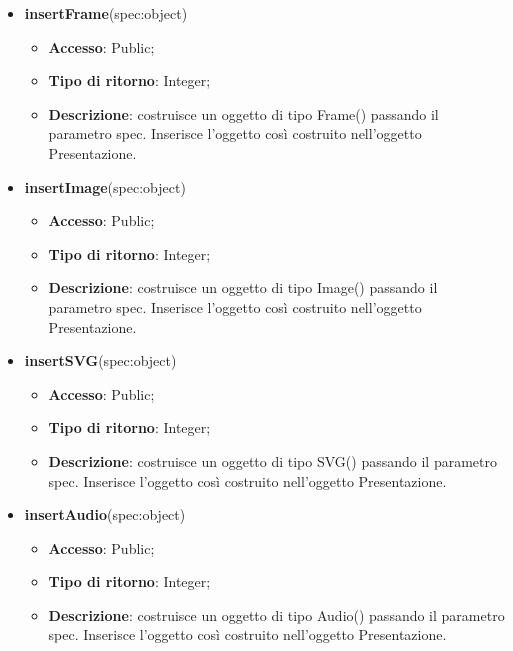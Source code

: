 {\begin{itemize}
\begin{itemize}
				\item \textbf{Accesso}: Public;
				\item \textbf{Tipo di ritorno}: Void;
				\item \textbf{Descrizione}: costruisce un oggetto di tipo Text() passando il parametro spec. Inserisce l’oggetto così costruito nell’oggetto Presentazione.
			\end{itemize}
			\item \textbf{insertFrame}(spec:object)
			\begin{itemize}
				\item \textbf{Accesso}: Public;
				\item \textbf{Tipo di ritorno}: Integer;
				\item \textbf{Descrizione}: costruisce un oggetto di tipo Frame() passando il parametro spec. Inserisce l’oggetto così costruito nell’oggetto Presentazione.
			\end{itemize}
			\item \textbf{insertImage}(spec:object)
			\begin{itemize}
				\item \textbf{Accesso}: Public;
				\item \textbf{Tipo di ritorno}: Integer;
				\item \textbf{Descrizione}: costruisce un oggetto di tipo Image() passando il parametro spec. Inserisce l’oggetto così costruito nell’oggetto Presentazione.
			\end{itemize}
			\item \textbf{insertSVG}(spec:object)
			\begin{itemize}
				\item \textbf{Accesso}: Public;
				\item \textbf{Tipo di ritorno}: Integer;
				\item \textbf{Descrizione}: costruisce un oggetto di tipo SVG() passando il parametro spec. Inserisce l’oggetto così costruito nell’oggetto Presentazione.
			\end{itemize}
			\item \textbf{insertAudio}(spec:object)
			\begin{itemize}
				\item \textbf{Accesso}: Public;
				\item \textbf{Tipo di ritorno}: Integer;
				\item \textbf{Descrizione}: costruisce un oggetto di tipo Audio() passando il parametro spec. Inserisce l’oggetto così costruito nell’oggetto Presentazione.
			\end{itemize}

\end{itemize}}
